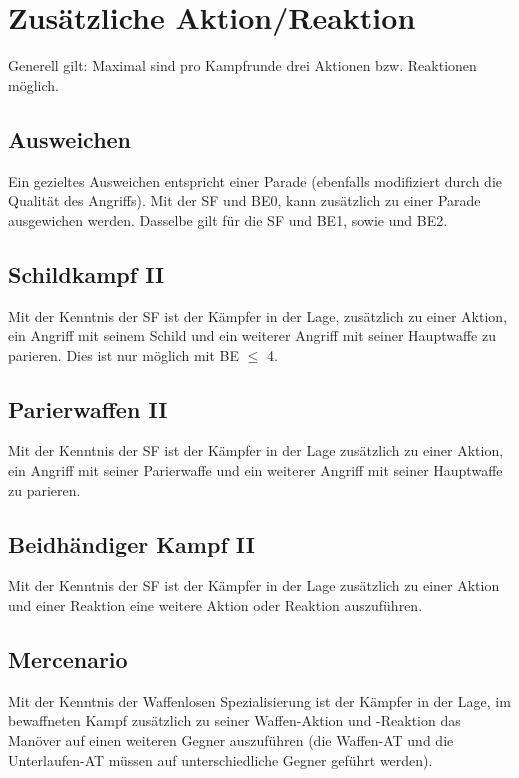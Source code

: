 %


\section{Zusätzliche Aktion/Reaktion}
\label{chap.aktion}
Generell gilt: Maximal sind pro Kampfrunde drei Aktionen bzw. Reaktionen möglich.

\subsection{Ausweichen}
\label{chap.aktion.ausweichen}
Ein gezieltes Ausweichen entspricht einer Parade (ebenfalls modifiziert durch die Qualität des Angriffs). Mit der SF  und BE0, kann zusätzlich zu einer Parade ausgewichen werden.
Dasselbe gilt für die SF  und BE1, sowie  und BE2.

\subsection{Schildkampf II}
\label{chap.aktion.schildkampf}
Mit der Kenntnis der SF  ist der Kämpfer in der Lage, zusätzlich zu einer Aktion, ein Angriff mit seinem Schild und ein weiterer Angriff mit seiner Hauptwaffe zu parieren.
Dies ist nur möglich mit BE\textrm{ ${\leq}$ }4.

\subsection{Parierwaffen II}
\label{chap.aktion.parierwaffen}
Mit der Kenntnis der SF  ist der Kämpfer in der Lage zusätzlich zu einer Aktion, ein Angriff mit seiner Parierwaffe und ein weiterer Angriff mit seiner Hauptwaffe zu parieren.

\subsection{Beidhändiger Kampf II}
\label{chap.aktion.beidhaendiger_kampf}
Mit der Kenntnis der SF  ist der Kämpfer in der Lage zusätzlich zu einer Aktion und einer Reaktion eine weitere Aktion oder Reaktion auszuführen.

\subsection{Mercenario}
\label{chap.aktion.mercenario}
Mit der Kenntnis der Waffenlosen Spezialisierung  ist der Kämpfer in der Lage, im bewaffneten Kampf zusätzlich zu seiner Waffen-Aktion und -Reaktion das Manöver  auf einen weiteren Gegner auszuführen (die Waffen-AT und die Unterlaufen-AT müssen auf unterschiedliche Gegner geführt werden).
